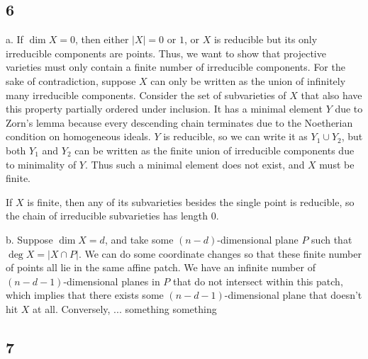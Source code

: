 \documentclass{article}
\begin{document}
\subsection*{6}
a. If $\dim X=0$, then either $|X|=0$ or $1$, or $X$ is reducible but its only irreducible components are points. Thus, we want to show that projective varieties must only contain a finite number of irreducible components. For the sake of contradiction, suppose $X$ can only be written as the union of infinitely many irreducible components. Consider the set of subvarieties of $X$ that also have this property partially ordered under inclusion. It has a minimal element $Y$ due to Zorn's lemma because every descending chain terminates due to the Noetherian condition on homogeneous ideals. $Y$ is reducible, so we can write it as $Y_1\cup Y_2$, but both $Y_1$ and $Y_2$ can be written as the finite union of irreducible components due to minimality of $Y$. Thus such a minimal element does not exist, and $X$ must be finite.

If $X$ is finite, then any of its subvarieties besides the single point is reducible, so the chain of irreducible subvarieties has length $0$.

b. Suppose $\dim X=d$, and take some $(n-d)$-dimensional plane $P$ such that $\deg X=|X\cap P|$. We can do some coordinate changes so that these finite number of points all lie in the same affine patch. We have an infinite number of $(n-d-1)$-dimensional planes in $P$ that do not intersect within this patch, which implies that there exists some $(n-d-1)$-dimensional plane that doesn't hit $X$ at all. Conversely, ... something something
\subsection*{7}
\end{document}
